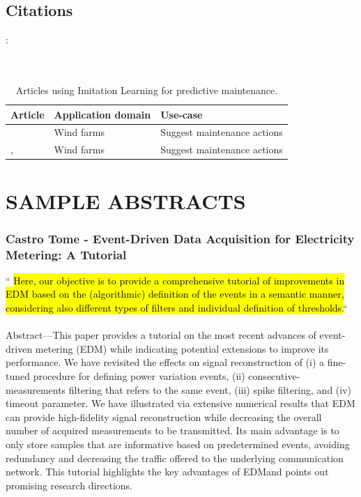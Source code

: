 \documentclass{article}
\newcommand{\hlc}[2][blue!10]{{\colorlet{foo}{#1} \sethlcolor{foo}\hl{#2}}}
\begin{document}
		
		\subsection{Citations}
		
		\citep{Tabatabaie2021}: 
		\cite{Wang2023} \\
		\citet{Mao2018-1928}\\
		\citep{Wabartha2020-2140}\\
		
		\begingroup
		\setlength{\tabcolsep}{6pt}
		\begin{table}[h!]
			\centering
			\renewcommand{\arraystretch}{2} 
			
			\begin{tabular}{L{4cm} L{4cm} L{6cm}}	
				\textbf{Article} & \textbf{Application domain} & \textbf{Use-case}\\
				\midrule[0.005pt]
				\citet{Pinciroli2022-752} & Wind farms & Suggest maintenance actions \\
				\citet{Mao2018-1928}, 	 & Wind farms & Suggest maintenance actions \\
				\midrule[0.01pt]
			\end{tabular}
			\caption{Articles using Imitation Learning for predictive maintenance.}
			\label{tbl:SLR}
		\end{table}
		\endgroup	
		
		
		\section{SAMPLE ABSTRACTS}
		
		
		\subsubsection{Castro Tome - Event-Driven Data Acquisition for Electricity Metering: A Tutorial}
		``\hlc{Here, our objective is to provide a comprehensive tutorial of improvements in EDM based on the (algorithmic) definition of the events in a semantic manner, considering also different types of filters and individual definition of thresholds.}``\\ \\
		
		Abstract—This paper provides a tutorial on the most recent advances of event-driven metering (EDM) while indicating potential extensions to improve its performance. We have revisited the effects on signal reconstruction of (i) a fine-tuned procedure for defining power variation events, (ii) consecutive-measurements filtering that refers to the same event, (iii) spike filtering, and (iv) timeout parameter. We have illustrated via extensive numerical results that EDM can provide high-fidelity signal reconstruction while decreasing the overall number of acquired measurements to be transmitted. Its main advantage is to only store samples that are informative based on predetermined events, avoiding redundancy and decreasing the traffic offered to the underlying communication network. This tutorial highlights the key advantages of EDMand points out promising research directions.
		
\end{document}
